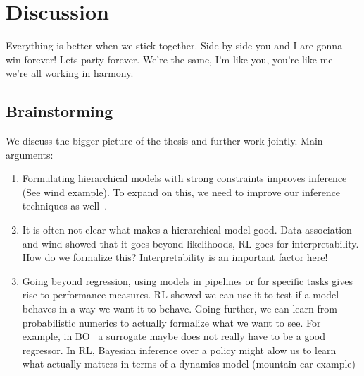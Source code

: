 \chapter{Discussion}
\label{toc:discussion}
Everything is better when we stick together.
Side by side you and I are gonna win forever!
Lets party forever.
We're the same, I'm like you, you're like me---we're all working in harmony.

\section{Brainstorming}
We discuss the bigger picture of the thesis and further work jointly.
Main arguments:
\begin{enumerate}
    \item Formulating hierarchical models with strong constraints improves inference (See wind example). To expand on this, we need to improve our inference techniques as well~\parencite{ustyuzhaninov_compositional_2020}.
    \item It is often not clear what makes a hierarchical model good. Data association and wind showed that it goes beyond likelihoods, RL goes for interpretability. How do we formalize this? Interpretability is an important factor here!
    \item Going beyond regression, using models in pipelines or for specific tasks gives rise to performance measures. RL showed we can use it to test if a model behaves in a way we want it to behave. Going further, we can learn from probabilistic numerics to actually formalize what we want to see. For example, in BO~\parencite{bodin_modulating_2020} a surrogate maybe does not really have to be a good regressor. In RL, Bayesian inference over a policy might alow us to learn what actually matters in terms of a dynamics model (mountain car example)
\end{enumerate}

